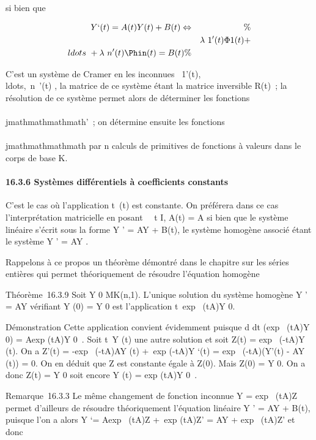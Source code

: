 si bien que

\begin{align*} Y `(t) = A(t)Y (t) + B(t)
\Leftrightarrow&& \%& \\
& & \lambda~1'(t)\Phi1(t) +
\\ldots~ +
\lambda~n'(t)\Phin(t) = B(t)\%&
\\ \end{align*}

C'est un système de Cramer en les inconnues
\lambda~1'(t),\\ldots,\lambda~n~'(t)
, la matrice de ce système étant la matrice inversible R(t)~; la
résolution de ce système permet alors de déterminer les fonctions
\lambda~\\\\jmathmathmathmath'~; on détermine ensuite les fonctions \lambda~\\\\jmathmathmathmath par n
calculs de primitives de fonctions à valeurs dans le corps de base K.

\paragraph{16.3.6 Systèmes différentiels à coefficients constants}

C'est le cas où l'application t\mapsto~\ell(t) est
constante. On préférera dans ce cas l'interprétation matricielle en
posant \forall~~t \in I, A(t) = A si bien que le système
linéaire s'écrit sous la forme Y ' = AY + B(t), le système homogène
associé étant le système Y ' = AY .

Rappelons à ce propos un théorème démontré dans le chapitre sur les
séries entières qui permet théoriquement de résoudre l'équation homogène

Théorème~16.3.9 Soit Y 0 \in MK(n,1). L'unique
solution du système homogène Y ' = AY vérifiant Y (0) = Y 0
est l'application
t\mapsto~exp~ (tA)Y
0.

Démonstration Cette application convient évidemment puisque  d
\over dt (exp~ (tA)Y
0) = Aexp (tA)Y 0~. Soit
t\mapsto~Y (t) une autre solution et soit Z(t)
= exp~ (-tA)Y (t). On a Z'(t) =
-exp~ (-tA)AY (t) +\
exp (-tA)Y `(t) = exp~ (-tA)(Y'(t) - AY (t))
= 0. On en déduit que Z est constante égale à Z(0). Mais Z(0) = Y
0. On a donc Z(t) = Y 0 soit encore Y (t)
= exp (tA)Y 0~.

Remarque~16.3.3 Le même changement de fonction inconnue Y
= exp~ (tA)Z permet d'ailleurs de résoudre
théoriquement l'équation linéaire Y ' = AY + B(t), puisque l'on a alors
Y `= Aexp~ (tA)Z +\
exp (tA)Z' = AY + exp~ (tA)Z' et donc

